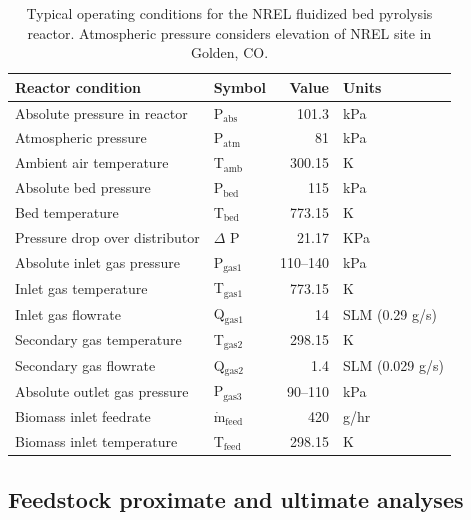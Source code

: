\begin{table}[H]
    \centering
    \caption{Typical operating conditions for the NREL fluidized bed pyrolysis reactor. Atmospheric pressure considers elevation of NREL site in Golden, CO.}
    \label{tab:operating}
    \begin{tabular}{llrl}
        \toprule
        Reactor condition & Symbol & Value & Units \\
        \midrule
        Absolute pressure in reactor   & P$_{\textrm{abs}}$  & 101.3     & kPa \\
        Atmospheric pressure           & P$_{\textrm{atm}}$  & 81        & kPa \\
        Ambient air temperature        & T$_{\textrm{amb}}$  & 300.15    & K \\
        Absolute bed pressure          & P$_{\textrm{bed}}$  & 115       & kPa  \\
        Bed temperature                & T$_{\textrm{bed}}$  & 773.15    & K \\
        Pressure drop over distributor & $\Delta$ P          & 21.17     & KPa \\
        Absolute inlet gas pressure    & P$_{\textrm{gas1}}$ & 110--140  & kPa \\
        Inlet gas temperature          & T$_{\textrm{gas1}}$ & 773.15    & K \\
        Inlet gas flowrate             & Q$_{\textrm{gas1}}$ & 14        & SLM (0.29 g/s) \\
        Secondary gas temperature      & T$_{\textrm{gas2}}$ & 298.15    & K \\
        Secondary gas flowrate         & Q$_{\textrm{gas2}}$ & 1.4       & SLM (0.029 g/s) \\
        Absolute outlet gas pressure   & P$_{\textrm{gas3}}$ & 90--110   & kPa \\
        Biomass inlet feedrate         & $\dot{{\textrm{m}}}_{\textrm{feed}}$ & 420 & g/hr \\
        Biomass inlet temperature      & T$_{\textrm{feed}}$ & 298.15    & K \\
        \bottomrule
    \end{tabular}
\end{table}

\subsection{Feedstock proximate and ultimate analyses}

